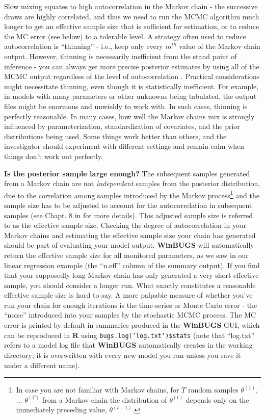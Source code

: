 Slow mixing equates to high autocorrelation in the Markov chain - the
successive draws are highly correlated, and thus we need to run the
MCMC algorithm much longer to get an effective sample size that is
sufficient for estimation, or to reduce the MC error (see below) to a
tolerable level.  A strategy often used to reduce autocorrelation is
``thinning'' - i.e., keep only every $m^{th}$ value of the Markov
chain output. However, thinning is necessarily inefficient from the
stand point of inference - you can always get more precise posterior
estimates by using all of the MCMC output regardless of the level of
autocorrelation \citep{maceachern_berliner:1994,
  link_eaton:2011}. Practical considerations might necessitate
thinning, even though it is statistically inefficient. For example, in
models with many parameters or other unknowns being tabulated, the
output files might be enormous and unwieldy to work with. In such
cases, thinning is perfectly reasonable. In many cases, how well the
Markov chains mix is strongly influenced by parameterization,
standardization of covariates, and the prior distributions being
used. Some things work better than others, and the investigator should
experiment with different settings and remain calm when things don't
work out perfectly.


{\bf Is the posterior sample large enough?}  The subsequent samples
generated from a Markov chain are not {\it independent} samples from the
posterior distribution, due to the correlation among samples
introduced by the Markov process\footnote{In case you are not familiar
  with Markov chains, for $T$ random samples $\theta^ {(1)}$,
  ... $\theta^{(T)}$ from a Markov chain the distribution of
  $\theta^{(t)}$ depends only on the immediately preceding value,
  $\theta^{(t-1)}$.} and the sample size has to be adjusted to account
for the autocorrelation in subsequent samples (see Chapt. 8 in
\citet{robert_casella:2010} for more details). This adjusted sample
size is referred to as the effective sample size. Checking the degree
of autocorrelation in your Markov chains and estimating the effective
sample size your chain has generated should be part of evaluating your
model output. {\bf WinBUGS} will automatically return the effective
sample size for all monitored parameters, as we saw in our linear regression example (the ``n.eff'' column of the summary output). If you find that your
supposedly long Markov chain has only generated a very short effective
sample, you should consider a longer run. What exactly constitutes a
reasonable effective sample size is hard to say. A more palpable
measure of whether you've run your chain for enough iterations is the
time-series or Monte Carlo error - the ``noise'' introduced into your
samples by the stochastic MCMC process. The MC error  is printed by default in summaries produced in the {\bf
  WinBUGS} GUI, which can be reproduced in {\bf R} using {\tt bugs.log('log.txt')\$stats} (note that ``log.txt'' refers to a model log file that {\bf
  WinBUGS} automatically creates in the working directory; it is overwritten with every new model you run unless you save it under a different name).
 
